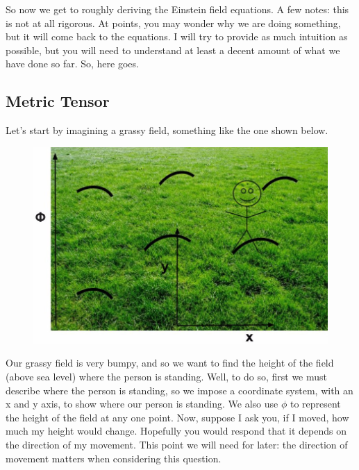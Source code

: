 So now we get to roughly deriving the Einstein field equations. A few notes: this is not at all rigorous. At points, you may wonder why we are doing
something, but it will come back to the equations. I will try to provide as much intuition as possible, but you will need to understand
at least a decent amount of what we have done so far. So, here goes.
\subsection{Metric Tensor}
Let's start by imagining a grassy field, something like the one shown below.
\begin{figure}[H]
\includegraphics[scale=0.25]{field.jpg}
\end{figure}
Our grassy field is very bumpy, and so we want to find the height of the field (above sea level) where the person is standing. Well, to do so, first we must describe where the person is standing, so we impose a coordinate system, with an x and y axis, to show where our person is standing.
We also use $\phi$ to represent the height of the field at any one point. 
Now, suppose I ask you, if I moved, how much my height would change. Hopefully you would respond that it depends on the direction
of my movement. This point we will need for later: the direction of movement matters when considering this question.

